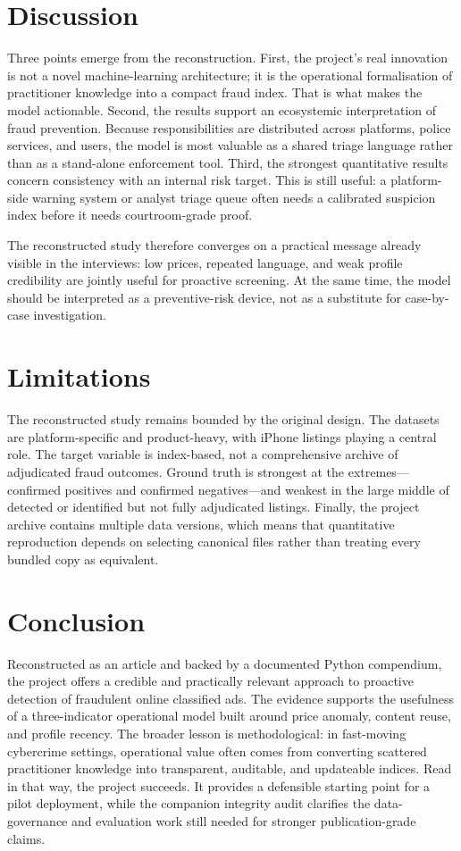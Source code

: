 \documentclass[11pt,a4paper]{article}
\begin{document}
\section{Discussion}
Three points emerge from the reconstruction. First, the project's real innovation is not a novel machine-learning architecture; it is the operational formalisation of practitioner knowledge into a compact fraud index. That is what makes the model actionable. Second, the results support an ecosystemic interpretation of fraud prevention. Because responsibilities are distributed across platforms, police services, and users, the model is most valuable as a shared triage language rather than as a stand-alone enforcement tool. Third, the strongest quantitative results concern consistency with an internal risk target. This is still useful: a platform-side warning system or analyst triage queue often needs a calibrated suspicion index before it needs courtroom-grade proof.

The reconstructed study therefore converges on a practical message already visible in the interviews: low prices, repeated language, and weak profile credibility are jointly useful for proactive screening. At the same time, the model should be interpreted as a preventive-risk device, not as a substitute for case-by-case investigation.

\section{Limitations}
The reconstructed study remains bounded by the original design. The datasets are platform-specific and product-heavy, with iPhone listings playing a central role. The target variable is index-based, not a comprehensive archive of adjudicated fraud outcomes. Ground truth is strongest at the extremes---confirmed positives and confirmed negatives---and weakest in the large middle of detected or identified but not fully adjudicated listings. Finally, the project archive contains multiple data versions, which means that quantitative reproduction depends on selecting canonical files rather than treating every bundled copy as equivalent.

\section{Conclusion}
Reconstructed as an article and backed by a documented Python compendium, the project offers a credible and practically relevant approach to proactive detection of fraudulent online classified ads. The evidence supports the usefulness of a three-indicator operational model built around price anomaly, content reuse, and profile recency. The broader lesson is methodological: in fast-moving cybercrime settings, operational value often comes from converting scattered practitioner knowledge into transparent, auditable, and updateable indices. Read in that way, the project succeeds. It provides a defensible starting point for a pilot deployment, while the companion integrity audit clarifies the data-governance and evaluation work still needed for stronger publication-grade claims.
\end{document}
